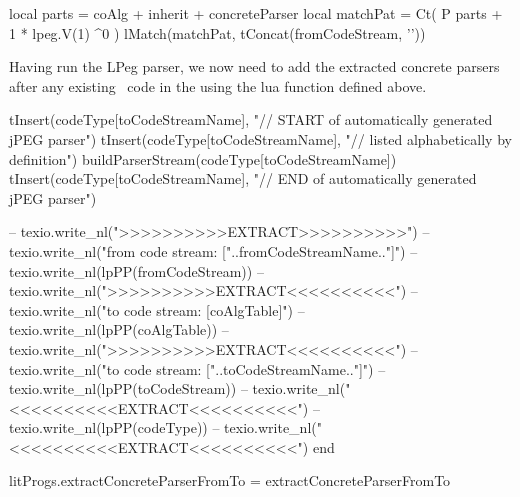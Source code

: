 \startLuaCode
  local parts    = coAlg + inherit + concreteParser
  local matchPat = Ct( P{ parts + 1 * lpeg.V(1) }^0 )
  lMatch(matchPat, tConcat(fromCodeStream, '\n\n'))
\stopLuaCode

Having run the LPeg parser, we now need to add the extracted concrete 
parsers after any existing \joylol\ code in the  using 
the lua function  defined above.

\startLuaCode
  tInsert(codeType[toCodeStreamName], 
    "// START of automatically generated jPEG parser")
  tInsert(codeType[toCodeStreamName],
    "// listed alphabetically by definition")
  buildParserStream(codeType[toCodeStreamName])
  tInsert(codeType[toCodeStreamName], 
    "// END of automatically generated jPEG parser")
  
--  texio.write_nl(">>>>>>>>>>EXTRACT>>>>>>>>>>")
--  texio.write_nl("from code stream: ["..fromCodeStreamName.."]")
--  texio.write_nl(lpPP(fromCodeStream))
--  texio.write_nl(">>>>>>>>>>EXTRACT<<<<<<<<<<")
--  texio.write_nl("to code stream: [coAlgTable]")
--  texio.write_nl(lpPP(coAlgTable))
--  texio.write_nl(">>>>>>>>>>EXTRACT<<<<<<<<<<")
--  texio.write_nl("to code stream: ["..toCodeStreamName.."]")
--  texio.write_nl(lpPP(toCodeStream))  
--  texio.write_nl("<<<<<<<<<<EXTRACT<<<<<<<<<<\n")
--  texio.write_nl(lpPP(codeType))
--  texio.write_nl("<<<<<<<<<<EXTRACT<<<<<<<<<<\n")
end

litProgs.extractConcreteParserFromTo = extractConcreteParserFromTo
\stopLuaCode


